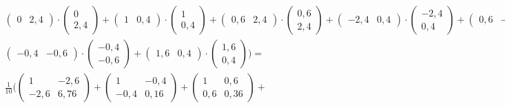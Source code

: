 \documentclass[a4paper,parskip=full-]{article}
\begin{document}
\begin{multline*}
\begin{pmatrix} 0 &  2,4 \end{pmatrix} \cdot
\begin{pmatrix} 0 \\ 2,4 \end{pmatrix} +
\begin{pmatrix} 1 &  0,4 \end{pmatrix} \cdot
\begin{pmatrix} 1 \\ 0,4 \end{pmatrix} +
\begin{pmatrix} 0,6 &  2,4 \end{pmatrix} \cdot
\begin{pmatrix} 0,6 \\ 2,4 \end{pmatrix} +
\begin{pmatrix} -2,4 &  0,4 \end{pmatrix} \cdot
\begin{pmatrix} -2,4 \\ 0,4 \end{pmatrix} +
\begin{pmatrix} 0,6 &  -2,6 \end{pmatrix} \cdot
\begin{pmatrix} 0,6 \\ -2,6 \end{pmatrix} + \\
\begin{pmatrix} -0,4 &  -0,6 \end{pmatrix} \cdot
\begin{pmatrix} -0,4 \\ -0,6 \end{pmatrix} +
\begin{pmatrix} 1,6 &  0,4 \end{pmatrix} \cdot
\begin{pmatrix} 1,6 \\ 0,4 \end{pmatrix}  
\Biggr) = \\ \frac{1}{10} \Biggl(
\begin{pmatrix} 1 & -2,6 \\ -2,6 & 6,76 \end{pmatrix} +
\begin{pmatrix} 1 & -0,4 \\ -0,4 & 0,16 \end{pmatrix} +
\begin{pmatrix} 1 & 0,6 \\ 0,6 & 0,36 \end{pmatrix} +

\end{multline*}
\end{document}
